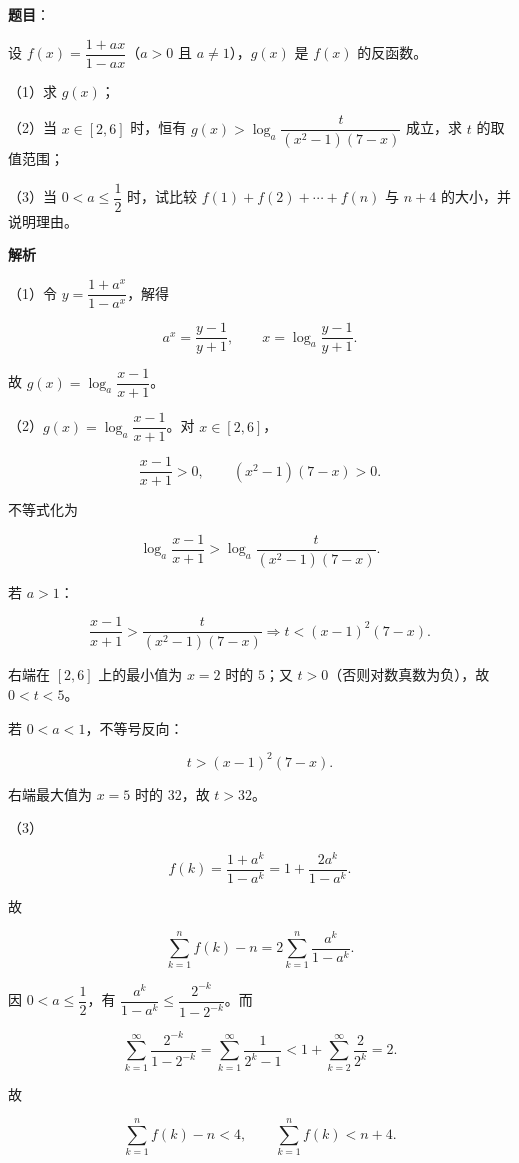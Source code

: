 \begin{answer}

\textbf{题目}：

设 $f(x)=\dfrac{1+ax}{1-ax}$（$a>0$ 且 $a\neq1$），$g(x)$ 是 $f(x)$ 的反函数。

（1）求 $g(x)$；

（2）当 $x\in[2,6]$ 时，恒有 $g(x)>\log_a\dfrac{t}{(x^2-1)(7-x)}$ 成立，求 $t$ 的取值范围；

（3）当 $0<a\leqslant\dfrac12$ 时，试比较 $f(1)+f(2)+\cdots+f(n)$ 与 $n+4$ 的大小，并说明理由。

\textbf{解析}

（1）令 $y=\dfrac{1+a^x}{1-a^x}$，解得

\nopagebreak[4]
\[a^x=\frac{y-1}{y+1},\qquad x=\log_a\frac{y-1}{y+1}.\]

故 $g(x)=\log_a\dfrac{x-1}{x+1}$。

（2）$g(x)=\log_a\dfrac{x-1}{x+1}$。对 $x\in[2,6]$，

\nopagebreak[4]
\[\frac{x-1}{x+1}>0,\qquad (x^2-1)(7-x)>0.\]

不等式化为

\nopagebreak[4]
\[\log_a\frac{x-1}{x+1}>\log_a\frac{t}{(x^2-1)(7-x)}.\]

若 $a>1$：

\nopagebreak[4]
\[\frac{x-1}{x+1}>\frac{t}{(x^2-1)(7-x)}
\Longrightarrow t<(x-1)^2(7-x).\]

右端在 $[2,6]$ 上的最小值为 $x=2$ 时的 $5$；又 $t>0$（否则对数真数为负），故 $0<t<5$。

若 $0<a<1$，不等号反向：

\nopagebreak[4]
\[t>(x-1)^2(7-x).\]

右端最大值为 $x=5$ 时的 $32$，故 $t>32$。

（3）

\nopagebreak[4]
\[f(k)=\frac{1+a^k}{1-a^k}=1+\frac{2a^k}{1-a^k}.\]

故

\nopagebreak[4]
\[\sum_{k=1}^n f(k)-n=2\sum_{k=1}^n\frac{a^k}{1-a^k}.\]

因 $0<a\leqslant\dfrac12$，有 $\dfrac{a^k}{1-a^k}\leqslant\dfrac{2^{-k}}{1-2^{-k}}$。而

\nopagebreak[4]
\[\sum_{k=1}^\infty\frac{2^{-k}}{1-2^{-k}}
=\sum_{k=1}^\infty\frac1{2^k-1}
<1+\sum_{k=2}^\infty\frac2{2^k}=2.\]

故

\nopagebreak[4]
\[\sum_{k=1}^n f(k)-n<4,\qquad
\sum_{k=1}^n f(k)<n+4.\]


\end{answer}